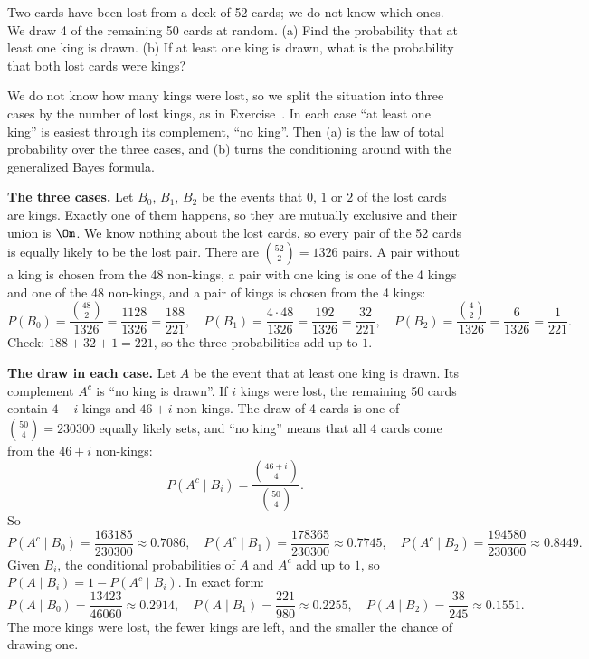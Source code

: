 
\begin{problem}
	Two cards have been lost from a deck of 52 cards; we do not know which ones.
	We draw 4 of the remaining 50 cards at random.
	(a) Find the probability that at least one king is drawn.
	(b) If at least one king is drawn, what is the probability that both lost
	cards were kings?
\end{problem}

\begin{solution}
	\idea We do not know how many kings were lost, so we split the situation into
	three cases by the number of lost kings, as in
	Exercise~. In each case ``at least one king'' is
	easiest through its complement, ``no king''. Then (a) is the law of total
	probability over the three cases, and (b) turns the conditioning around with
	the generalized Bayes formula.

	\medskip
	\textbf{The three cases.} Let $B_0$, $B_1$, $B_2$ be the events that $0$,
	$1$ or $2$ of the lost cards are kings. Exactly one of them happens, so they
	are mutually exclusive and their union is $\Om$. We know nothing about the
	lost cards, so every pair of the 52 cards is equally likely to be the lost
	pair. There are $\binom{52}{2}=1326$ pairs. A pair without a king is chosen
	from the 48 non-kings, a pair with one king is one of the 4 kings and one of
	the 48 non-kings, and a pair of kings is chosen from the 4 kings:
	\[ P(B_0)=\frac{\binom{48}{2}}{1326}=\frac{1128}{1326}=\frac{188}{221},\quad
		P(B_1)=\frac{4\cdot48}{1326}=\frac{192}{1326}=\frac{32}{221},\quad
		P(B_2)=\frac{\binom{4}{2}}{1326}=\frac{6}{1326}=\frac{1}{221}. \]
	Check: $188+32+1=221$, so the three probabilities add up to $1$.

	\medskip
	\textbf{The draw in each case.} Let $A$ be the event that at least one king
	is drawn. Its complement $A^c$ is ``no king is drawn''. If $i$ kings were
	lost, the remaining 50 cards contain $4-i$ kings and $46+i$ non-kings. The
	draw of 4 cards is one of $\binom{50}{4}=230300$ equally likely sets, and
	``no king'' means that all 4 cards come from the $46+i$ non-kings:
	\[ P(A^c\mid B_i)=\frac{\binom{46+i}{4}}{\binom{50}{4}}. \]
	So
	\[ P(A^c\mid B_0)=\frac{163185}{230300}\approx0.7086,\quad
		P(A^c\mid B_1)=\frac{178365}{230300}\approx0.7745,\quad
		P(A^c\mid B_2)=\frac{194580}{230300}\approx0.8449. \]
	Given $B_i$, the conditional probabilities of $A$ and $A^c$ add up to $1$,
	so $P(A\mid B_i)=1-P(A^c\mid B_i)$. In exact form:
	\[ P(A\mid B_0)=\frac{13423}{46060}\approx0.2914,\quad
		P(A\mid B_1)=\frac{221}{980}\approx0.2255,\quad
		P(A\mid B_2)=\frac{38}{245}\approx0.1551. \]
	The more kings were lost, the fewer kings are left, and the smaller the
	chance of drawing one.


\end{solution}
